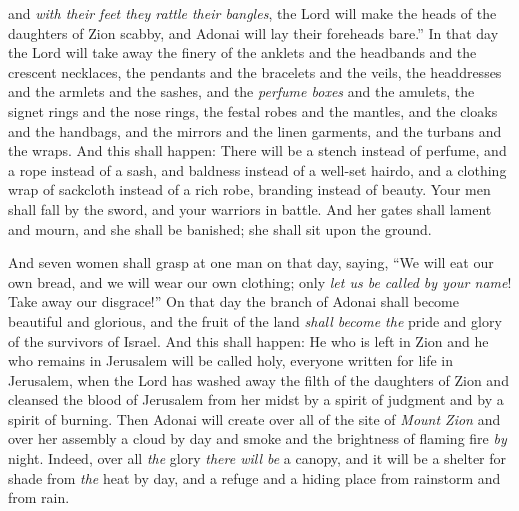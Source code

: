 \begin{biblechapter}
and \textit{with their feet they rattle their bangles},
\verse the Lord will make the heads of the daughters of Zion scabby, 
and Adonai will lay their foreheads bare.”
\verse In that day the Lord will take away the finery of the anklets 
and the headbands and the crescent necklaces,
\verse the pendants and the bracelets and the veils,
\verse the headdresses and the armlets and the sashes, 
and the \textit{perfume boxes} and the amulets,
\verse the signet rings and the nose rings,
\verse the festal robes and the mantles, 
and the cloaks and the handbags,
\verse and the mirrors and the linen garments, 
and the turbans and the wraps.
\verse And this shall happen: There will be 
a stench instead of perfume, 
and a rope instead of a sash, 
and baldness instead of a well-set hairdo, 
and a clothing wrap of sackcloth instead of a rich robe, 
branding instead of beauty.
\verse Your men shall fall by the sword, 
and your warriors in battle.
\verse And her gates shall lament and mourn, 
and she shall be banished; 
she shall sit upon the ground.
\end{biblechapter}

\begin{biblechapter} %
\verse And seven women shall grasp at one man on that day, saying, 
“We will eat our own bread, 
and we will wear our own clothing; 
only \textit{let us be called by your name}! 
Take away our disgrace!”
 On that day the branch of Adonai shall become beautiful and glorious, 
and the fruit of the land \textit{shall become the} pride and glory of the survivors of Israel.
\verse And this shall happen: He who is left in Zion 
and he who remains in Jerusalem will be called holy, 
everyone written for life in Jerusalem,
\verse when the Lord has washed away the filth of the daughters of Zion 
and cleansed the blood of Jerusalem from her midst 
by a spirit of judgment 
and by a spirit of burning.
\verse Then Adonai will create over all of the site of \textit{Mount Zion} 
and over her assembly a cloud by day 
and smoke and the brightness of flaming fire \textit{by} night. 
Indeed, over all \textit{the} glory \textit{there will be} a canopy,
\verse and it will be a shelter for shade from \textit{the} heat by day, 
and a refuge and a hiding place from rainstorm and from rain.
\end{biblechapter}

